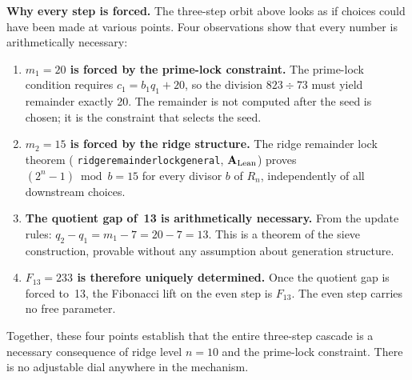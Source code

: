 \documentclass[11pt,openany]{book}
\theoremstyle{remark}
\newcommand{\lean}[1]{%
  \penalty-100
  \begingroup\def\_{\textunderscore\allowbreak}\texttt{#1}\endgroup}
\newcommand{\CatAL}{\ensuremath{\textbf{A}_{\rm Lean}}}
\begin{document}
\medskip

\noindent\textbf{Why every step is forced.}\enspace
The three-step orbit above looks as if choices could have been made at various points.
Four observations show that every number is arithmetically necessary:

\begin{enumerate}[itemsep=4pt,topsep=5pt]
\item \textbf{$m_1 = 20$ is forced by the prime-lock constraint.}
  The prime-lock condition requires $c_1 = b_1 q_1 + 20$, so the division $823 \div 73$
  must yield remainder exactly 20.
  The remainder is not computed after the seed is chosen; it is the constraint that
  selects the seed.

\item \textbf{$m_2 = 15$ is forced by the ridge structure.}
  The ridge remainder lock theorem
  (\lean{ridge\_remainder\_lock\_general}, \CatAL)
  proves $(2^n - 1) \bmod b = 15$ for every divisor $b$ of $R_n$, independently of
  all downstream choices.

\item \textbf{The quotient gap of~13 is arithmetically necessary.}
  From the update rules: $q_2 - q_1 = m_1 - 7 = 20 - 7 = 13$.
  This is a theorem of the sieve construction, provable without any assumption about
  generation structure.

\item \textbf{$F_{13} = 233$ is therefore uniquely determined.}
  Once the quotient gap is forced to~13, the Fibonacci lift on the even step is $F_{13}$.
  The even step carries no free parameter.
\end{enumerate}

Together, these four points establish that the entire three-step cascade is a necessary
consequence of ridge level $n = 10$ and the prime-lock constraint.
There is no adjustable dial anywhere in the mechanism.
\end{document}
